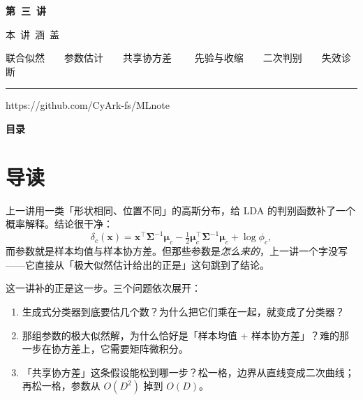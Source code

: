 \documentclass[11pt,a4paper,fontset=windows,zihao=-4]{ctexart}
\makeatletter
\newcommand{\bx}{\mathbf{x}}
\newcommand{\bSigma}{\boldsymbol{\Sigma}}
\newcommand{\bmu}{\boldsymbol{\mu}}
\newcommand{\tp}{^{\top}}
\renewcommand{\tableofcontents}{%
  \par\begingroup
    \sffamily\Large\bfseries\color{navy}目\quad 录\par
  \endgroup
  \vspace{0.85em}
  \setlength{\parskip}{0pt}%
  \@starttoc{toc}%
}
\makeatother
\begin{document}
\begin{titlepage}
\vspace*{3.10cm}
{\color{goldlight}\sffamily\bfseries\Large 第\ 三\ 讲\par}
\vspace{1.05cm}
{\color{steel}\sffamily\footnotesize 本\ 讲\ 涵\ 盖\par}
\vspace{0.26cm}
{\color{grey}\footnotesize 联合似然\ \ \textperiodcentered\ \ 参数估计\ \ \textperiodcentered\ \ 共享协方差
 \ \ \textperiodcentered\ \ 先验与收缩\ \ \textperiodcentered\ \ 二次判别\ \ \textperiodcentered\ \ 失效诊断\par}

\vspace{3.55cm}
{\color{navy!30}\rule{3.0cm}{0.4pt}\par}
\vspace{0.32cm}
{\color{grey}\footnotesize https://github.com/CyArk-fs/MLnote\par}
\end{titlepage}

\setcounter{page}{1}

\tableofcontents
\thispagestyle{plain}
\clearpage

\setcounter{page}{1}

\section*{导\quad 读}

上一讲用一类「形状相同、位置不同」的高斯分布，给 LDA 的判别函数补了一个概率解释。结论很干净：
\[
  \delta_c(\bx)=\bx\tp\bSigma^{-1}\bmu_c-\tfrac12\bmu_c\tp\bSigma^{-1}\bmu_c+\log\phi_c,
\]
而参数就是样本均值与样本协方差。但那些参数是\emph{怎么来的}，上一讲一个字没写——它直接从「极大似然估计给出的正是」这句跳到了结论。

这一讲补的正是这一步。三个问题依次展开：

\begin{enumerate}[label=\textcolor{navy}{\bfseries(\arabic*)},leftmargin=2.4em]
  \item 生成式分类器到底要估几个数？为什么把它们乘在一起，就变成了分类器？
  \item 那组参数的极大似然解，为什么恰好是「样本均值 + 样本协方差」？难的那一步在协方差上，它需要矩阵微积分。
  \item 「共享协方差」这条假设能松到哪一步？松一格，边界从直线变成二次曲线；再松一格，参数从 $O(D^2)$ 掉到 $O(D)$。
\end{enumerate}
\end{document}

